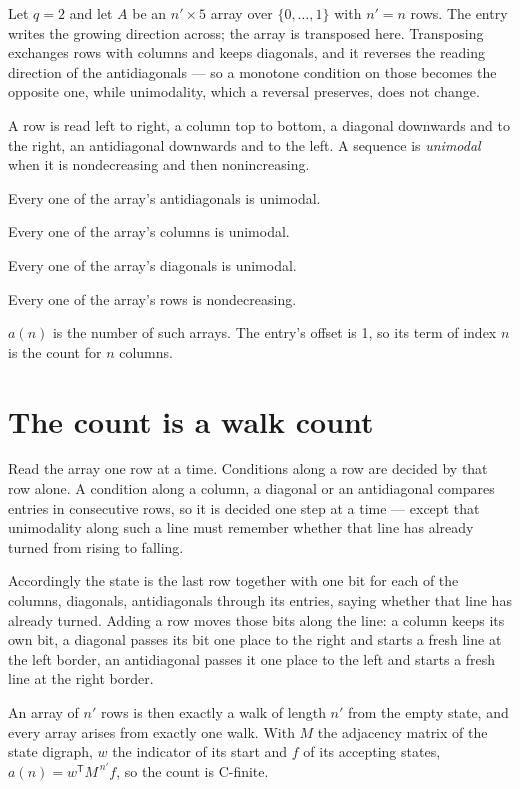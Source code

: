 \documentclass[11pt]{article}
\theoremstyle{definition}
\begin{document}
Let $q = 2$ and let $A$ be an $n' \times 5$ array over $\{0,\dots,1\}$ with $n' = n$ rows. The entry writes the growing direction across; the array is transposed here. Transposing exchanges rows with columns and keeps diagonals, and it reverses the reading direction of the antidiagonals --- so a monotone condition on those becomes the opposite one, while unimodality, which a reversal preserves, does not change.

A row is read left to right, a column top to bottom, a diagonal downwards and to the right, an antidiagonal downwards and to the left. A sequence is {\itshape unimodal} when it is nondecreasing and then nonincreasing.

Every one of the array's antidiagonals is unimodal.

Every one of the array's columns is unimodal.

Every one of the array's diagonals is unimodal.

Every one of the array's rows is nondecreasing.

$a(n)$ is the number of such arrays. The entry's offset is 1, so its term of index $n$ is the count for $n$ columns.

\section{The count is a walk count}

Read the array one row at a time. Conditions along a row are decided by that row alone. A condition along a column, a diagonal or an antidiagonal compares entries in consecutive rows, so it is decided one step at a time --- except that unimodality along such a line must remember whether that line has already turned from rising to falling.

Accordingly the state is the last row together with one bit for each of the columns, diagonals, antidiagonals through its entries, saying whether that line has already turned. Adding a row moves those bits along the line: a column keeps its own bit, a diagonal passes its bit one place to the right and starts a fresh line at the left border, an antidiagonal passes it one place to the left and starts a fresh line at the right border.

An array of $n'$ rows is then exactly a walk of length $n'$ from the empty state, and every array arises from exactly one walk. With $M$ the adjacency matrix of the state digraph, $w$ the indicator of its start and $f$ of its accepting states, $a(n) = w^{\mathsf T}M^{\,n'}f$, so the count is C-finite.
\end{document}
